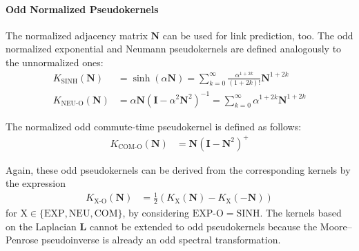 \documentclass[11pt,a4paper]{book}
\begin{document}
\paragraph{Odd Normalized Pseudokernels}
The normalized adjacency matrix $\mathbf N$ can be used for link
prediction, too.  The odd normalized exponential and Neumann
pseudokernels are defined analogously to the unnormalized ones:
\begin{align}
  K_{\mathrm{SINH}}(\mathbf{N}) &= \sinh(\alpha \mathbf N) =
  \sum_{k=0}^\infty \frac {\alpha^{1+2k}}  {(1+2k)!} \mathbf N^{1+2k} 
  \label{eq:normalized-matrix-hyperbolic-sine} \\
  K_\textrm{NEU-O} (\mathbf N) &= \alpha \mathbf N (\mathbf I - \alpha^2
  \mathbf N^2)^{-1} = 
  \sum_{k=0}^\infty \alpha^{1+2k} \mathbf N^{1+2k} 
  \label{eq:odd-normalized-neumann-pseudokernel}
\end{align}

The normalized odd commute-time pseudokernel is defined as follows:
\begin{align}
  K_\textrm{COM-O}(\mathbf N) &=
  \mathbf N (\mathbf I - \mathbf N^2)^+
  \label{eq:odd-normalized-commute-time-kernel}
\end{align}

Again, these odd pseudokernels can be derived from the corresponding
kernels by the expression
\begin{align*}
  K_\textrm{X-O}(\mathbf N) &= \frac 12 \left( K_\mathrm X(\mathbf N) -
  K_\mathrm X(-\mathbf N)\right)
\end{align*}
for $\mathrm X \in \{\mathrm{EXP}, \mathrm{NEU}, \mathrm{COM}\}$, by
considering $\textrm{EXP-O} = \mathrm{SINH}$. 
The kernels based on the Laplacian $\mathbf L$ cannot be extended to odd
pseudokernels because the Moore--Penrose pseudoinverse is already an odd
spectral transformation. 
\end{document}
